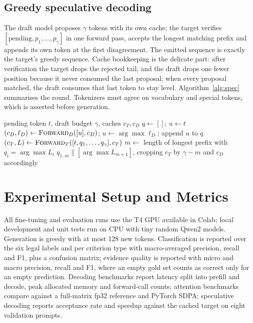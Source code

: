 \documentclass[conference]{IEEEtran}
\begin{document}
\subsection{Greedy speculative decoding}
The draft model proposes $\gamma$ tokens with its own cache; the target verifies
$[\text{pending}, p_1, \dots, p_\gamma]$ in one forward pass, accepts the longest matching prefix and
appends its own token at the first disagreement. The emitted sequence is exactly the target's greedy
sequence. Cache bookkeeping is the delicate part: after verification the target drops the rejected
tail, and the draft drops one fewer position because it never consumed the last proposal; when every
proposal matched, the draft consumes that last token to stay level. Algorithm~\ref{alg:spec}
summarises the round. Tokenizers must agree on vocabulary and special tokens, which is asserted
before generation.

\begin{algorithm}[t]
\caption{One speculative round}
\label{alg:spec}
\begin{algorithmic}[1]
\Require pending token $t$, draft budget $\gamma$, caches $c_T, c_D$
\State $q \gets []$; $u \gets t$
  \State $(c_D, \ell_D) \gets \textsc{Forward}_D([u], c_D)$; $u \gets \arg\max \ell_D$; append $u$ to $q$
\EndFor
\State $(c_T, L) \gets \textsc{Forward}_T([t, q_1, \dots, q_\gamma], c_T)$
\State $m \gets$ length of longest prefix with $q_i = \arg\max L_i$
\State \Return $q_{1..m} \parallel [\arg\max L_{m+1}]$, cropping $c_T$ by $\gamma-m$ and $c_D$ accordingly
\end{algorithmic}
\end{algorithm}

\section{Experimental Setup and Metrics}
All fine-tuning and evaluation runs use the T4 GPU available in Colab; local development and unit
tests run on CPU with tiny random Qwen2 models. Generation is greedy with at most 128 new tokens.
Classification is reported over the six legal labels and per criterion type with macro-averaged
precision, recall and F1, plus a confusion matrix; evidence quality is reported with micro and macro
precision, recall and F1, where
an empty gold set counts as correct only for an empty prediction. Decoding benchmarks report
latency split into prefill and decode, peak allocated memory and forward-call counts; attention
benchmarks compare against a full-matrix fp32 reference and PyTorch SDPA; speculative decoding
reports acceptance rate and speedup against the cached target on eight validation prompts.
\end{document}
